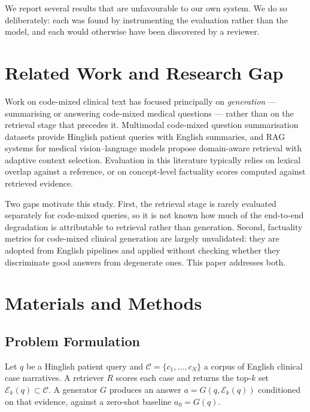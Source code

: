 \documentclass[pdflatex,sn-mathphys-num]{sn-jnl}
\theoremstyle{thmstyleone}
\theoremstyle{thmstyletwo}
\theoremstyle{thmstylethree}
\begin{document}
We report several results that are unfavourable to our own system. We do so
deliberately: each was found by instrumenting the evaluation rather than the model, and
each would otherwise have been discovered by a reviewer.

\section{Related Work and Research Gap}\label{sec:related}

Work on code-mixed clinical text has focused principally on \emph{generation} ---
summarising or answering code-mixed medical questions --- rather than on the retrieval
stage that precedes it. Multimodal code-mixed question summarisation datasets provide
Hinglish patient queries with English summaries, and RAG systems for medical
vision--language models propose domain-aware retrieval with adaptive context
selection. Evaluation in this literature typically relies on lexical overlap against a
reference, or on concept-level factuality scores computed against retrieved evidence.

Two gaps motivate this study. First, the retrieval stage is rarely evaluated separately
for code-mixed queries, so it is not known how much of the end-to-end degradation is
attributable to retrieval rather than generation. Second, factuality metrics for
code-mixed clinical generation are largely unvalidated: they are adopted from English
pipelines and applied without checking whether they discriminate good answers from
degenerate ones. This paper addresses both.

\section{Materials and Methods}\label{sec:methods}

\subsection{Problem Formulation}\label{subsec:problem}

Let $q$ be a Hinglish patient query and $\mathcal{C} = \{c_1,\dots,c_N\}$ a corpus of
English clinical case narratives. A retriever $R$ scores each case and returns the
top-$k$ set $\mathcal{E}_k(q) \subset \mathcal{C}$. A generator $G$ produces an answer
$a = G(q, \mathcal{E}_k(q))$ conditioned on that evidence, against a zero-shot baseline
$a_0 = G(q)$.
\end{document}
